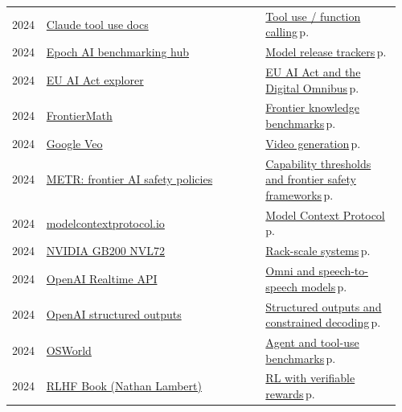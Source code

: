 \documentclass[10pt,a4paper,openany]{report}
\begin{document}
{\begin{longtable}{@{}p{0.07\linewidth}>{\raggedright}p{0.55\linewidth}>{\raggedright\arraybackslash}p{0.34\linewidth}@{}}
2024 & \href{https://docs.claude.com/en/docs/agents-and-tools/tool-use/overview}{Claude tool use docs} & \hyperref[c:agents-5]{Tool use / function calling}\,{\color{muted}\scriptsize p.\,\pageref{c:agents-5}}\\
2024 & \href{https://epoch.ai/benchmarks}{Epoch AI benchmarking hub} & \hyperref[c:landscape-4]{Model release trackers}\,{\color{muted}\scriptsize p.\,\pageref{c:landscape-4}}\\
2024 & \href{https://artificialintelligenceact.eu}{EU AI Act explorer} & \hyperref[c:safety-11]{EU AI Act and the Digital Omnibus}\,{\color{muted}\scriptsize p.\,\pageref{c:safety-11}}\\
2024 & \href{https://epoch.ai/frontiermath}{FrontierMath} & \hyperref[c:evals-6]{Frontier knowledge benchmarks}\,{\color{muted}\scriptsize p.\,\pageref{c:evals-6}}\\
2024 & \href{https://deepmind.google/models/veo/}{Google Veo} & \hyperref[c:embodied-6]{Video generation}\,{\color{muted}\scriptsize p.\,\pageref{c:embodied-6}}\\
2024 & \href{https://metr.org/faisc}{METR: frontier AI safety policies} & \hyperref[c:safety-0]{Capability thresholds and frontier safety frameworks}\,{\color{muted}\scriptsize p.\,\pageref{c:safety-0}}\\
2024 & \href{https://modelcontextprotocol.io}{modelcontextprotocol.io} & \hyperref[c:protocols-0]{Model Context Protocol}\,{\color{muted}\scriptsize p.\,\pageref{c:protocols-0}}\\
2024 & \href{https://www.nvidia.com/en-us/data-center/gb200-nvl72/}{NVIDIA GB200 NVL72} & \hyperref[c:hardware-0]{Rack-scale systems}\,{\color{muted}\scriptsize p.\,\pageref{c:hardware-0}}\\
2024 & \href{https://platform.openai.com/docs/guides/realtime}{OpenAI Realtime API} & \hyperref[c:vlm-7]{Omni and speech-to-speech models}\,{\color{muted}\scriptsize p.\,\pageref{c:vlm-7}}\\
2024 & \href{https://platform.openai.com/docs/guides/structured-outputs}{OpenAI structured outputs} & \hyperref[c:context-9]{Structured outputs and constrained decoding}\,{\color{muted}\scriptsize p.\,\pageref{c:context-9}}\\
2024 & \href{https://os-world.github.io}{OSWorld} & \hyperref[c:evals-5]{Agent and tool-use benchmarks}\,{\color{muted}\scriptsize p.\,\pageref{c:evals-5}}\\
2024 & \href{https://rlhfbook.com}{RLHF Book (Nathan Lambert)} & \hyperref[c:reasoning-2]{RL with verifiable rewards}\,{\color{muted}\scriptsize p.\,\pageref{c:reasoning-2}}\\

\end{longtable}}
\end{document}
